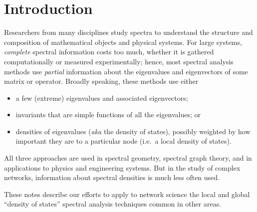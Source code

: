 \section{Introduction}
\label{sec:intro}

Researchers from many disciplines study spectra to understand the
structure and composition of mathematical objects and physical systems.
For large systems, {\em complete} spectral information costs too much,
whether it is gathered computationally or measured experimentally;
hence, most spectral analysis methods use {\em partial} information
about the eigenvalues and eigenvectors of some matrix or operator.
Broadly speaking, these methods use either
\begin{itemize}
\item
  a few (extreme) eigenvalues and associated eigenvectors;
\item
  invariants that are simple functions of all the eigenvalues; or
\item densities of eigenvalues ({\em aka} the density of states),
  possibly weighted by how important they are to a particular node
  (i.e.~a local density of states).
\end{itemize}
All three approaches are used in spectral geometry, spectral graph
theory, and in applications to physics and engineering systems. But in
the study of complex networks, information about spectral
densities is much less often used.

These notes describe our efforts to apply to network science the local
and global ``density of states'' spectral analysis techniques common in
other areas.
